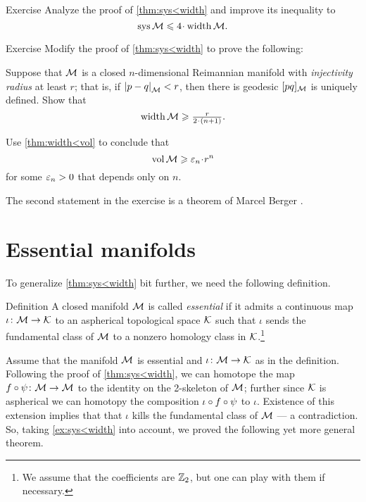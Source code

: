 \begin{thm}{Exercise}\label{ex:sys<width}
Analyze the proof of \ref{thm:sys<width} and improve its inequality to 
 \[\sys\spc{M}\le 4 \cdot \width \spc{M}.\]
\end{thm}

\begin{thm}{Exercise}\label{ex:fillrad-inj}
Modify the proof of \ref{thm:sys<width} to prove the following:

Suppose that $\mathcal{M}$ is a closed $n$-dimensional Reimannian manifold with \emph{injectivity radius} at least $r$; that is, if $\dist{p}{q}{\spc{M}}<r$, then there is geodesic $[pq]_{\mathcal{M}}$ is uniquely defined.
Show that
\[\width\spc{M}\ge \tfrac{r}{2\cdot(n+1)}.\]

Use \ref{thm:width<vol} to conclude that  
\[\vol\spc{M}\ge \eps_n \cdot r^n \]
for some $\varepsilon_n>0$ that depends only on $n$.
\end{thm} 

The second statement in the exercise is a theorem of Marcel Berger \cite{berger-n}.


\section{Essential manifolds}

To generalize \ref{thm:sys<width} bit further, we need the following definition.

\begin{thm}{Definition}
A closed manifold $\mathcal{M}$ is called \emph{essential} if it admits a continuous map $\iota\colon\mathcal{M}\to \mathcal{K}$ to an aspherical topological space $\mathcal{K}$ such that $\iota$ sends the fundamental class of $\mathcal{M}$ to a nonzero homology class in $\mathcal{K}$.\footnote{We assume that the coefficients are $\mathbb{Z}_2$, but one can play with them if necessary.}
\end{thm}

Assume that the manifold $\mathcal{M}$ is essential and $\iota \colon\mathcal{M}\to \mathcal{K}$ as in the definition.
Following the proof of \ref{thm:sys<width}, we can homotope the map 
$f\circ\psi\colon\mathcal{M}\to \mathcal{M}$ to the identity on the 2-skeleton of $\mathcal{M}$;
further since $\mathcal{K}$ is aspherical we can homotopy the composition
$\iota\z\circ f\circ\psi$ to  $\iota$. 
Existence of this extension implies that that $\iota$ kills the fundamental class of $\mathcal{M}$ --- a contradiction.
So, taking \ref{ex:sys<width} into account, we proved the following yet more general theorem.

